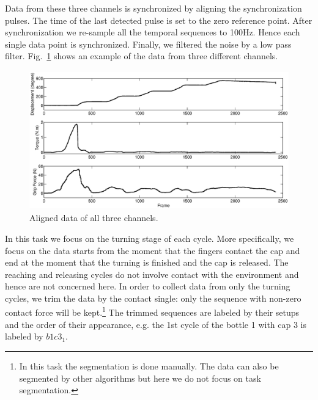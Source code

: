 Data from these three channels is synchronized by aligning the synchronization pulses. The time of the last detected pulse is set to the zero reference point. After synchronization we re-sample all the temporal sequences to 100Hz. Hence each single data point is synchronized. Finally, we filtered the noise by a low pass filter. Fig.~\ref{fig:3channels} shows an example of the data from three different channels.




\begin{figure}
  \centering
  \includegraphics[height=6cm]{./fig/b3c2_5_sTF.eps}
  \caption{ \scriptsize{Aligned data of all three channels.}
}
\label{fig:3channels}
\end{figure}

In this task we focus on the turning stage of each cycle. More specifically, we focus on the data starts from the moment that the fingers contact the cap and end at the moment that the turning is finished and the cap is released. The reaching and releasing cycles do not involve contact with the environment and hence are not concerned here.
In order to collect data from only the turning cycles, we trim the data by the contact single: only the sequence with non-zero contact force will be kept.\footnote{In this task the segmentation is done manually. The data can also be segmented by other algorithms but here we do not focus on task segmentation.} The trimmed sequences are labeled by their setups and the order of their appearance, e.g. the 1st cycle of the bottle 1 with cap 3 is labeled by $b1c3_1$.

